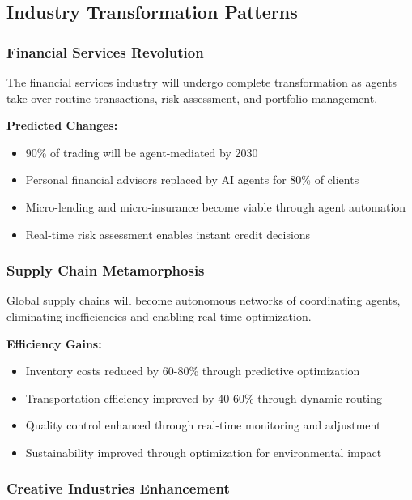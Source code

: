 \documentclass[12pt,a4paper]{article}
\begin{document}
\subsection{Industry Transformation Patterns}

\subsubsection{Financial Services Revolution}

The financial services industry will undergo complete transformation as agents take over routine transactions, risk assessment, and portfolio management.

\textbf{Predicted Changes:}
\begin{itemize}
\item 90\% of trading will be agent-mediated by 2030
\item Personal financial advisors replaced by AI agents for 80\% of clients
\item Micro-lending and micro-insurance become viable through agent automation
\item Real-time risk assessment enables instant credit decisions
\end{itemize}

\subsubsection{Supply Chain Metamorphosis}

Global supply chains will become autonomous networks of coordinating agents, eliminating inefficiencies and enabling real-time optimization.

\textbf{Efficiency Gains:}
\begin{itemize}
\item Inventory costs reduced by 60-80\% through predictive optimization
\item Transportation efficiency improved by 40-60\% through dynamic routing
\item Quality control enhanced through real-time monitoring and adjustment
\item Sustainability improved through optimization for environmental impact
\end{itemize}

\subsubsection{Creative Industries Enhancement}
\end{document}

